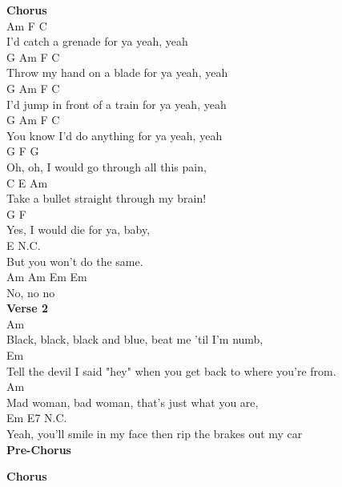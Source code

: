 \documentclass[a4paper]{article}
\begin{document}
{{        }
        \textbf{Chorus}
        ~\\
        {
            \cutive
            \obeyspaces
                Am         F    C
\\
I'd catch a grenade for ya yeah, yeah
\\
         G         Am           F    C
\\
Throw my hand on a blade for ya yeah, yeah
\\
            G            Am         F    C
\\
I'd jump in front of a train for ya yeah, yeah
\\
             G       Am         F    C
\\
You know I'd do anything for ya yeah, yeah
\\
    G           F                  G
\\
Oh, oh, I would go through all this pain,
\\
       C               E           Am
\\
Take a bullet straight through my brain!
\\
G               F
\\
Yes, I would die for ya, baby,
\\
E N.C.
\\
   But you won't do the same. 
\\
Am  Am  Em  Em
\\
          No, no no
\\

        }
        \textbf{Verse 2}
        ~\\
        {
            \cutive
            \obeyspaces
Am
\\
Black, black, black and blue, beat me 'til I'm numb,
\\
          Em
\\
Tell the devil I said "hey" when you get back to where you're from.
\\
Am
\\
Mad woman, bad woman, that's just what you are,
\\
               Em                            E7 N.C.
\\
Yeah, you'll smile in my face then rip the brakes out my car
\\

        }
        \textbf{Pre-Chorus}
        ~\\
        {
            \cutive
            \obeyspaces

        }
        \textbf{Chorus}
        ~\\
        {
            \cutive
            \obeyspaces

}}
\end{document}
